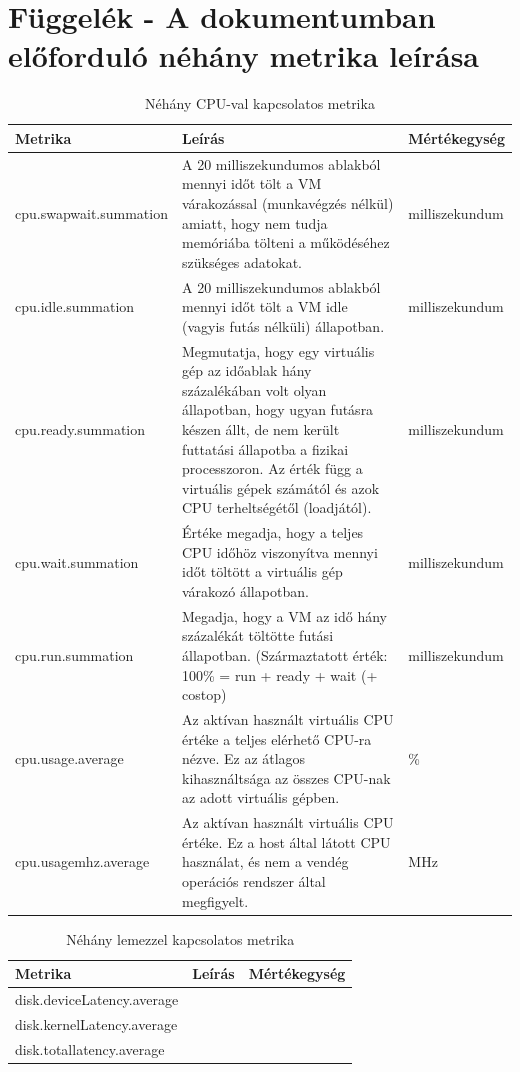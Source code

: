 \documentclass[a4paper,10pt,titlepage]{article}
\begin{document}
\section{Függelék - A dokumentumban előforduló néhány metrika leírása}

\begin{table}[h]
	\caption{Néhány CPU-val kapcsolatos metrika}
	\centering
	\small
	\begin{tabular}{| p{3.5cm} | p{7.5cm} | p{2cm} |}
		\hline
		\rowcolor{tc_bone} \textbf{Metrika} & \textbf{Leírás} & \textbf{Mértékegység} \\
		\hline
		cpu.swapwait.summation & A 20 milliszekundumos ablakból mennyi időt tölt a VM várakozással (munkavégzés nélkül) amiatt, hogy nem tudja memóriába tölteni a működéséhez szükséges adatokat. & milliszekundum \\ 
		\hline
		cpu.idle.summation & A 20 milliszekundumos ablakból mennyi időt tölt a VM idle (vagyis futás nélküli) állapotban. & milliszekundum \\ 
		\hline
		cpu.ready.summation & Megmutatja, hogy egy virtuális gép az időablak hány százalékában volt olyan állapotban, hogy ugyan futásra készen állt, de nem került futtatási állapotba a fizikai processzoron. Az érték függ a virtuális gépek számától és azok CPU terheltségétől (loadjától). & milliszekundum \\ 
		\hline
		cpu.wait.summation & Értéke megadja, hogy a teljes CPU időhöz viszonyítva mennyi időt töltött a virtuális gép várakozó állapotban. & milliszekundum \\ 
		\hline
		cpu.run.summation & Megadja, hogy a VM az idő hány százalékát töltötte futási állapotban. (Származtatott érték: 100\% = run + ready + wait (+ costop) & milliszekundum \\ 
		\hline
		cpu.usage.average & Az aktívan használt virtuális CPU értéke a teljes elérhető CPU-ra nézve. Ez az átlagos kihasználtsága az összes CPU-nak az adott virtuális gépben. & \% \\ 
		\hline
		cpu.usagemhz.average & Az aktívan használt virtuális CPU értéke. Ez a host által látott CPU használat, és nem a vendég operációs rendszer által megfigyelt. & MHz \\ 
		\hline
	\end{tabular}
	\normalsize
	\label{tab:cpu.metrics}
\end{table}

\begin{table}[h]
	\caption{Néhány lemezzel kapcsolatos metrika}
	\centering
	\small
	\begin{tabular}{| p{3.5cm} | p{7.5cm} | p{2cm} |}
		\hline
		\rowcolor{tc_bone} \textbf{Metrika} & \textbf{Leírás} & \textbf{Mértékegység} \\
		\hline
		disk.deviceLatency.average &  & \\ 
		\hline
		disk.kernelLatency.average & & \\ 
		\hline
		disk.totallatency.average & & \\ 
		\hline
	\end{tabular}
	\normalsize
	\label{tab:disk.totallatency.average}
\end{table}
\end{document}
